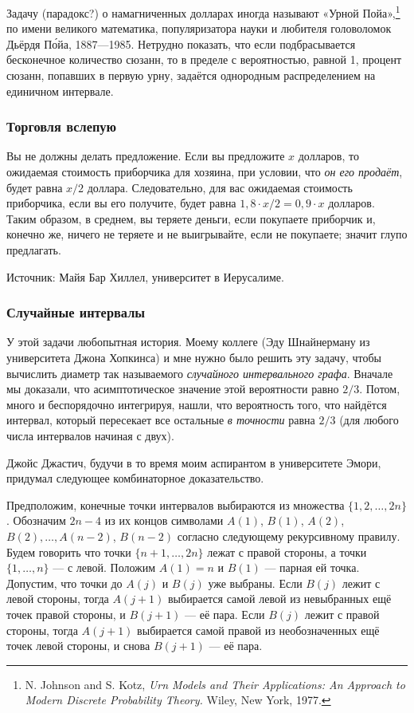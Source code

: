 Задачу (парадокс?) о намагниченных долларах иногда называют «Урной Пойа»,\footnote{N. Johnson and S. Kotz, \emph{Urn Models and Their Applications: An Approach to Modern Discrete Probability Theory.} Wiley, New York, 1977.} по имени великого математика, популяризатора науки и любителя головоломок Дьёрдя П\'{о}йа, 1887---1985.
Нетрудно показать, что если подбрасывается бесконечное количество сюзанн, то в пределе с вероятностью, равной 1, процент сюзанн, попавших в первую урну, задаётся однородным распределением на единичном интервале.

\subsubsection*{Торговля вслепую}%

Вы не должны делать предложение.
Если вы предложите $x$ долларов, то ожидаемая стоимость приборчика для хозяина, при условии, что \emph{он его продаёт}, будет равна $x/2$ доллара.
Следовательно, для вас ожидаемая стоимость приборчика, если вы его получите, будет равна $1{,}8 {\cdot} x/2=0{,}9{\cdot}x$ долларов.
Таким образом, в среднем, вы теряете деньги, если покупаете приборчик и, конечно же, ничего не теряете и не выигрывайте, если не покупаете;
значит глупо предлагать.
\heart

Источник: Майя Бар Хиллел, университет в Иерусалиме.

\subsubsection*{Случайные интервалы}%

У этой задачи любопытная история.
Моему коллеге (Эду Шнайнерману из университета Джона Хопкинса) и мне нужно было решить эту задачу, чтобы вычислить диаметр так называемого \emph{случайного интервального графа}. 
Вначале мы доказали, что асимптотическое значение этой вероятности равно $2/3$.
Потом, много и беспорядочно интегрируя, нашли, что вероятность того, что найдётся интервал, который пересекает все остальные \emph{в точности} равна $2/3$ (для любого числа интервалов начиная с двух).

Джойс Джастич, %
будучи в то время моим аспирантом в университете Эмори, придумал следующее комбинаторное доказательство.

Предположим, конечные точки интервалов выбираются из множества $\{1,2,\dots,2n\}$.
Обозначим $2n-4$ из их концов символами $A(1)$, $B(1)$, $A(2)$, $B(2),\dots, A(n-2)$, $B(n-2)$ согласно следующему рекурсивному правилу.
Будем говорить что точки $\{n+1, \dots , 2n\}$ лежат с правой стороны, а точки $\{1, \dots , n\}$ --- с левой.
Положим $A(1)=n$ и $B(1)$ --- парная ей точка.
Допустим, что точки до $A(j)$ и $B(j)$ уже выбраны. 
Если $B(j)$ лежит с левой стороны, тогда $A(j+1)$ выбирается самой левой из невыбранных ещё точек правой стороны, и $B(j+1)$ --- её пара.
Если $B(j)$ лежит с правой стороны, тогда $A(j+1)$ выбирается самой правой из необозначенных ещё точек левой стороны, и снова $B(j+1)$ --- её пара.

